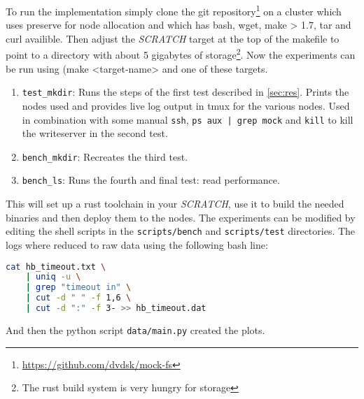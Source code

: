 To run the implementation simply clone the git repository\footnote{\url{https://github.com/dvdsk/mock-fs}} on a cluster which uses preserve for node allocation and which has bash, wget, make > 1.7, tar and curl availible. Then adjust the \textit{SCRATCH} target at the top of the makefile to point to a directory with about 5 gigabytes of storage\footnote{The rust build system is very hungry for storage}. Now the experiments can be run using (make <target-name> and one of these targets. 

\begin{enumerate}
	\item \texttt{test\_mkdir}: Runs the steps of the first test described in \cref{sec:res}. Prints the nodes used and provides live log output in tmux for the various nodes. Used in combination with some manual \texttt{ssh}, \texttt{ps aux | grep mock} and \texttt{kill} to kill the writeserver in the second test. 
	\item \texttt{bench\_mkdir}: Recreates the third test.
	\item \texttt{bench\_ls}: Runs the fourth and final test: read performance.
\end{enumerate}

This will set up a rust toolchain in your \textit{SCRATCH}, use it to build the needed binaries and then deploy them to the nodes. The experiments can be modified by editing the shell scripts in the \texttt{scripts/bench} and \texttt{scripts/test} directories. The logs where reduced to raw data using the following bash line:

\begin{lstlisting}[language=bash, style=boxed, tabsize=2]
cat hb_timeout.txt \
	| uniq -u \
	| grep "timeout in" \
	| cut -d " " -f 1,6 \
	| cut -d ":" -f 3- >> hb_timeout.dat
\end{lstlisting}

And then the python script \texttt{data/main.py} created the plots.
